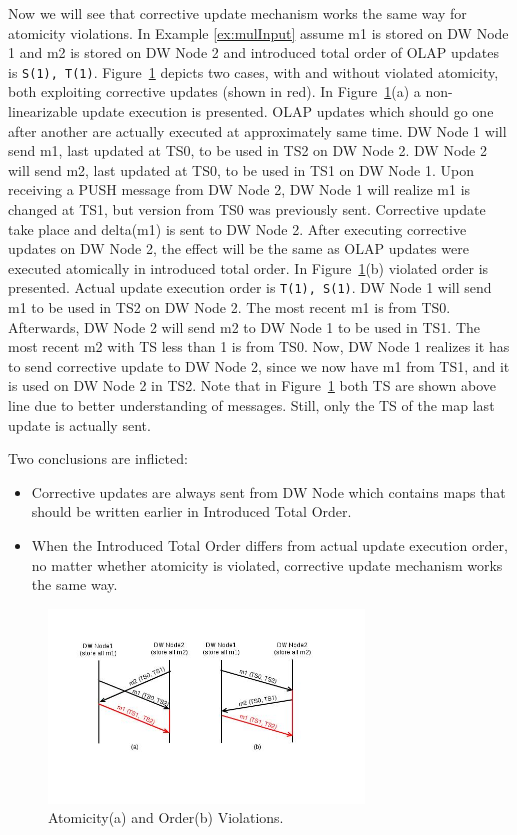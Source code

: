 \documentclass{sig-semester}
\def\OLAP{OLAP\xspace}
\def\EXORD{actual update execution order\xspace}
\begin{document}
Now we will see that corrective update mechanism works the same way for atomicity violations. In Example \ref{ex:mulInput} assume m1 is stored on DW Node 1 and m2 is stored on DW Node 2 and introduced total order of \OLAP updates is \texttt{S(1), T(1)}. Figure~\ref{fig:Atomicity} depicts two cases, with and without violated atomicity, both exploiting corrective updates (shown in red). In Figure~\ref{fig:Atomicity}(a) a non-linearizable update execution is presented. \OLAP updates which should go one after another are actually executed at approximately same time. DW Node 1 will send m1, last updated at TS0, to be used in TS2 on DW Node 2. DW Node 2 will send m2, last updated at TS0, to be used in TS1 on DW Node 1. Upon receiving a PUSH message from DW Node 2, DW Node 1 will realize m1 is changed at TS1, but version from TS0 was previously sent. Corrective update take place and delta(m1) is sent to DW Node 2. After executing corrective updates on DW Node 2, the effect will be the same as \OLAP updates were executed atomically in introduced total order. In Figure~\ref{fig:Atomicity}(b) violated order is presented. Actual update execution order is \texttt{T(1), S(1)}. DW Node 1 will send m1 to be used in TS2 on DW Node 2. The most recent m1 is from TS0. Afterwards, DW Node 2 will send m2 to DW Node 1 to be used in TS1. The most recent m2 with TS less than 1 is from TS0. Now, DW Node 1 realizes it has to send corrective update to DW Node 2, since we now have m1 from TS1, and it is used on DW Node 2 in TS2. Note that in Figure~\ref{fig:Atomicity} both TS are shown above line due to better understanding of messages. Still, only the TS of the map last update is actually sent.

Two conclusions are inflicted:
\begin{itemize}
 \item Corrective updates are always sent from DW Node which contains maps that should be written earlier in Introduced Total Order.

 \item When the Introduced Total Order differs from \EXORD, no matter whether atomicity is violated, corrective update mechanism works the same way. 
\end{itemize} 

\begin{figure}
\includegraphics[width=3.3in]{AtomicityOrder.jpg}
\vspace{-18mm}
\caption{Atomicity(a) and Order(b) Violations.}
\label{fig:Atomicity}
\vspace{-5mm}
\end{figure}
\end{document}
